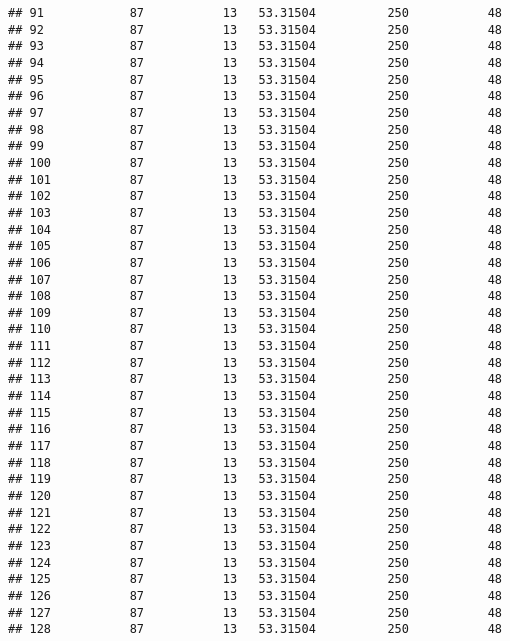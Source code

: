 \documentclass[]{article}
\begin{document}
\begin{verbatim}
## 91            87           13   53.31504          250           48
## 92            87           13   53.31504          250           48
## 93            87           13   53.31504          250           48
## 94            87           13   53.31504          250           48
## 95            87           13   53.31504          250           48
## 96            87           13   53.31504          250           48
## 97            87           13   53.31504          250           48
## 98            87           13   53.31504          250           48
## 99            87           13   53.31504          250           48
## 100           87           13   53.31504          250           48
## 101           87           13   53.31504          250           48
## 102           87           13   53.31504          250           48
## 103           87           13   53.31504          250           48
## 104           87           13   53.31504          250           48
## 105           87           13   53.31504          250           48
## 106           87           13   53.31504          250           48
## 107           87           13   53.31504          250           48
## 108           87           13   53.31504          250           48
## 109           87           13   53.31504          250           48
## 110           87           13   53.31504          250           48
## 111           87           13   53.31504          250           48
## 112           87           13   53.31504          250           48
## 113           87           13   53.31504          250           48
## 114           87           13   53.31504          250           48
## 115           87           13   53.31504          250           48
## 116           87           13   53.31504          250           48
## 117           87           13   53.31504          250           48
## 118           87           13   53.31504          250           48
## 119           87           13   53.31504          250           48
## 120           87           13   53.31504          250           48
## 121           87           13   53.31504          250           48
## 122           87           13   53.31504          250           48
## 123           87           13   53.31504          250           48
## 124           87           13   53.31504          250           48
## 125           87           13   53.31504          250           48
## 126           87           13   53.31504          250           48
## 127           87           13   53.31504          250           48
## 128           87           13   53.31504          250           48

\end{verbatim}
\end{document}
